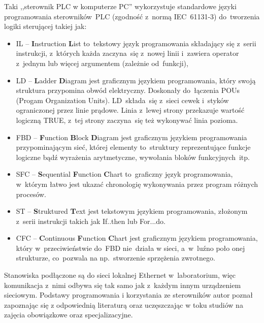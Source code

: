 Taki ,,sterownik PLC w komputerze PC'' wykorzystuje standardowe języki programowania sterowników~PLC (zgodność z~normą IEC~61131-3) do~tworzenia logiki sterującej takiej jak:
\begin{itemize}
\item IL -- \textbf{I}nstruction \textbf{L}ist to~tekstowy język programowania składający się z~serii instrukcji, z~których każda zaczyna~się z~nowej linii i~zawiera operator z~jednym lub więcej argumentem (zależnie od~funkcji),

\item LD -- \textbf{L}adder \textbf{D}iagram jest graficznym językiem programowania, który swoją struktura przypomina obwód elektryczny. Doskonały do~łączenia POUs (Progam Organization Units). LD~składa~się z~sieci cewek i~styków ograniczonej przez linie prądowe. Linia z~lewej strony przekazuje wartość logiczną TRUE, z~tej strony zaczyna~się też wykonywać linia pozioma.

\item FBD -- \textbf{F}unction \textbf{B}lock \textbf{D}iagram jest graficznym językiem programowania przypominającym sieć, której elementy to~struktury reprezentujące funkcje logiczne bądź wyrażenia arytmetyczne, wywołania bloków funkcyjnych~itp.

\item SFC -- \textbf{S}equential \textbf{F}unction \textbf{C}hart to~graficzny język programowania, w~którym łatwo jest ukazać chronologię wykonywania przez program różnych procesów.

\item ST -- \textbf{S}truktured \textbf{T}ext jest tekstowym językiem programowania, złożonym z~serii instrukcji takich jak If..then lub For...do.

\item CFC -- \textbf{C}ontinuous \textbf{F}unction \textbf{C}hart jest graficznym językiem programowania, który w~przeciwieństwie do~FBD nie~działa w sieci, a~w~luźno poło onej strukturze, co~pozwala na np.~stworzenie sprzężenia zwrotnego.
\end{itemize}

\indent
\indent Stanowiska podłączone są do sieci lokalnej Ethernet w~laboratorium, więc komunikacja z~nimi odbywa się tak samo jak z~każdym innym urządzeniem sieciowym. Podstawy programowania i korzystania ze sterowników autor poznał zapoznając się z odpowiednią literaturą \cite{plc1,plc2,plc4,plc5,plc6} oraz uczęszczając w toku studiów na zajęcia obowiązkowe oraz specjalizacyjne.

